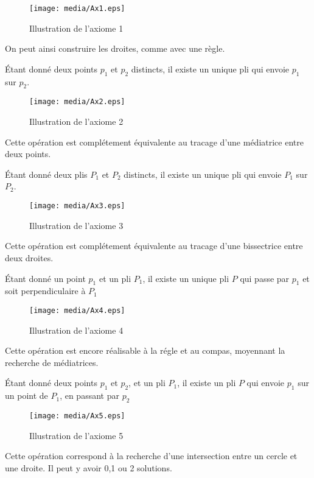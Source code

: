 \documentclass[a4paper,12pt,french]{report}
\begin{document}
		\begin{figure}
		    \begin{center}
			\texttt{[image: media/Ax1.eps]}
		    \end{center}
			\caption{Illustration de l'axiome 1}
		\end{figure}
		
		On peut ainsi construire les droites, comme avec une règle.
		\begin{axiome}[2]
			Étant donné deux points $p_{1}$ et $p_{2}$ distincts, il existe un unique pli qui envoie $p_{1}$ sur $p_{2}$.
		\end{axiome}
		
		\begin{figure}
		    \begin{center}
			\texttt{[image: media/Ax2.eps]}
		    \end{center}
			\caption{Illustration de l'axiome 2}
		\end{figure}
		
		Cette opération est complétement équivalente au tracage d'une médiatrice entre deux points.
		\begin{axiome}[3]
			Étant donné deux plis $P_{1}$ et $P_{2}$ distincts, il existe un unique pli qui envoie $P_{1}$ sur $P_{2}$.
		\end{axiome}
		
		\begin{figure}
		    \begin{center}
			\texttt{[image: media/Ax3.eps]}
		    \end{center}
			\caption{Illustration de l'axiome 3}
		\end{figure}
		
		Cette opération est complétement équivalente au tracage d'une bissectrice entre deux droites.
		\begin{axiome}[4]
			Étant donné un point $p_{1}$ et un pli $P_{1}$, il existe un unique pli $P$ qui passe par $p_{1}$ et soit perpendiculaire à $P_{1}$
		\end{axiome}
		
		\begin{figure}
		    \begin{center}
			\texttt{[image: media/Ax4.eps]}
		    \end{center}
			\caption{Illustration de l'axiome 4}
		\end{figure}
		Cette opération est encore réalisable à la régle et au compas, moyennant la recherche de médiatrices.
		\begin{axiome}[5]
			Étant donné deux points $p_{1}$ et $p_{2}$, et un pli $P_{1}$, il existe un pli $P$ qui envoie $p_{1}$ sur un point de $P_{1}$, en passant par $p_{2}$
		\end{axiome}
		\begin{figure}
		    \begin{center}
			\texttt{[image: media/Ax5.eps]}
		    \end{center}
			\caption{Illustration de l'axiome 5}
		\end{figure}
		Cette opération correspond à la recherche d'une intersection entre un cercle et une droite. Il peut y avoir 0,1 ou 2 solutions.
		
\end{document}
